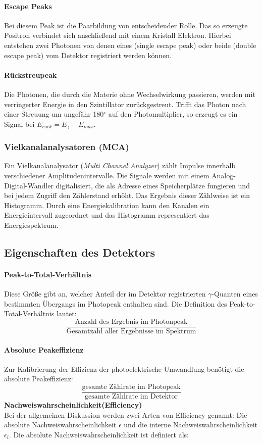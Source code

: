 \documentclass[ngerman,11pt]{article}
\begin{document}
\begin{multicols}{2}
		\paragraph{Escape Peaks}
		Bei diesem Peak ist die Paarbildung von entscheidender Rolle. Das so erzeugte Positron verbindet sich anschließend mit einem Kristall Elektron. Hierbei entstehen zwei Photonen von denen eines (single escape peak) oder beide (double escape peak) vom Detektor registriert werden können.
		\paragraph{Rückstreupeak}
		Die Photonen, die durch die Materie ohne Wechselwirkung passieren, werden mit verringerter Energie in den Szintillator zurückgestreut. Trifft das Photon nach einer Streuung um ungefähr 180$^{\circ}$ auf den Photomultiplier, so erzeugt es ein Signal bei $E_{rück}=E_\gamma-E_{max}$.

		\subsubsection{Vielkanalanalysatoren (MCA)}

		Ein Vielkanalanalysator (\textit{Multi Channel Analyzer}) zählt Impulse innerhalb verschiedener Amplitudenintervalle. Die Signale werden mit einem Analog-Digital-Wandler digitalisiert,  die als Adresse eines Speicherplätze fungieren und bei jedem Zugriff den Zählerstand erhöht. Das Ergebnis dieser Zählweise ist ein Histogramm. Durch eine Energiekalibration kann den Kanalen ein Energieintervall zugeordnet und das Histogramm representiert das Energiespektrum. \cite{messelektronik}

		\subsection{Eigenschaften des Detektors}

		\paragraph{Peak-to-Total-Verhältnis}
		Diese Größe gibt an, welcher Anteil der im Detektor registrierten  $\gamma$-Quanten eines bestimmten Übergangs im Photopeak enthalten sind. Die Definition des Peak-to-Total-Verhältnis lautet:
		\[
		\dfrac{\text{Anzahl des Ergebnis~im~Photonpeak}}{\text{Gesamtzahl~aller Ergebnisse~im~Spektrum}}
		\]
		\paragraph{Absolute Peakeffizienz}
		Zur Kalibrierung der Effizienz der photoelektrische Umwandlung benötigt die absolute Peakeffizienz: \cite{techniques}
		\[
		\dfrac{\text{gesamte Zählrate im Photopeak}}{\text{gesamte Zählrate im Detektor}}
		\]
		\textbf{Nachweiswahrscheinlichkeit(Efficiency)}\\
		Bei der allgemeinen Diskussion werden zwei Arten von Efficiency genannt: Die absolute Nachweiswahrscheinlichkeit $\epsilon$ und die interne Nachweiswahrscheinlichkeit $\epsilon_i$. Die absolute Nachweiswahrscheinlichkeit ist definiert als: \cite{techniques}


\end{multicols}
\end{document}
